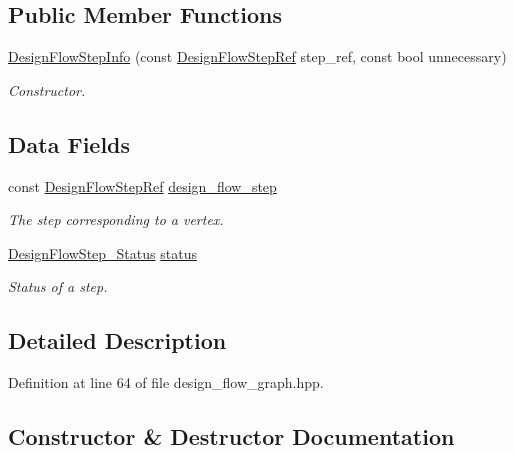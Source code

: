 \subsection*{Public Member Functions}
\begin{DoxyCompactItemize}
\item 
\hyperlink{structDesignFlowStepInfo_a504fd2b32c305fc3adf51b7e1a223523}{Design\+Flow\+Step\+Info} (const \hyperlink{design__flow__step_8hpp_a9dd6b4474ddf52d41a78b1aaa12ae6c8}{Design\+Flow\+Step\+Ref} step\+\_\+ref, const bool unnecessary)
\begin{DoxyCompactList}\small\item\em Constructor. \end{DoxyCompactList}\end{DoxyCompactItemize}
\subsection*{Data Fields}
\begin{DoxyCompactItemize}
\item 
const \hyperlink{design__flow__step_8hpp_a9dd6b4474ddf52d41a78b1aaa12ae6c8}{Design\+Flow\+Step\+Ref} \hyperlink{structDesignFlowStepInfo_a9e0186491f1e2dc72987359665b4cd60}{design\+\_\+flow\+\_\+step}
\begin{DoxyCompactList}\small\item\em The step corresponding to a vertex. \end{DoxyCompactList}\item 
\hyperlink{design__flow__step_8hpp_afb1f0d73069c26076b8d31dbc8ebecdf}{Design\+Flow\+Step\+\_\+\+Status} \hyperlink{structDesignFlowStepInfo_a1dd7a1aaa29dbf8356dc2ec0b6611bcc}{status}
\begin{DoxyCompactList}\small\item\em Status of a step. \end{DoxyCompactList}\end{DoxyCompactItemize}


\subsection{Detailed Description}


Definition at line 64 of file design\+\_\+flow\+\_\+graph.\+hpp.



\subsection{Constructor \& Destructor Documentation}
\mbox{\label{structDesignFlowStepInfo_a504fd2b32c305fc3adf51b7e1a223523}} 
